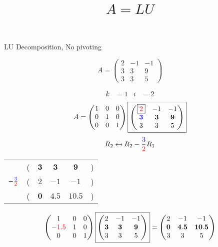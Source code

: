 \documentclass[pdf]{beamer}
\title{$A=LU$}
\subtitle{}
\author{}
\begin{document}
\begin{frame}{}
\begin{center}LU Decomposition, No pivoting\end{center} $$A = \begin{pmatrix}2&-1&-1\\3&3&9\\3&3&5\end{pmatrix}$$\end{frame}
\begin{frame}{}\begin{align*} k &= 1 & i &= 2 \end{align*} $$A=\begin{pmatrix}1&0&0\\0&1&0\\0&0&1\end{pmatrix} \boxed{\begin{pmatrix}\boxed{{\color{red}2}}&-1&-1\\\mathbf{{\color{blue}3}}&\mathbf{3}&\mathbf{9}\\3&3&5\end{pmatrix}} $$ $$R_2 \mapsfrom R_2 - \frac{{\color{blue}3}}{{\color{red}2}} R_1$$ \begin{center}\begin{tabular}{cccccc}  &(& $ \mathbf{3} $ & $ \mathbf{3} $ & $ \mathbf{9} $ &)\\$ -\frac{{\color{blue}3}}{{\color{red}2}} $&(& $ 2 $ & $ -1 $ & $ -1 $ &)\\\hline  &(& $ \mathbf{0} $ & $ \mathbf{4.5} $ & $ \mathbf{10.5} $ &) \end{tabular}\end{center} $$ \begin{pmatrix}1&0&0\\{\color{red}-1.5}&1&0\\0&0&1\end{pmatrix} \boxed{\begin{pmatrix}2&-1&-1\\\mathbf{3}&\mathbf{3}&\mathbf{9}\\3&3&5\end{pmatrix}} = \begin{pmatrix}2&-1&-1\\\mathbf{0}&\mathbf{4.5}&\mathbf{10.5}\\3&3&5\end{pmatrix} $$\end{frame}
\end{document}
